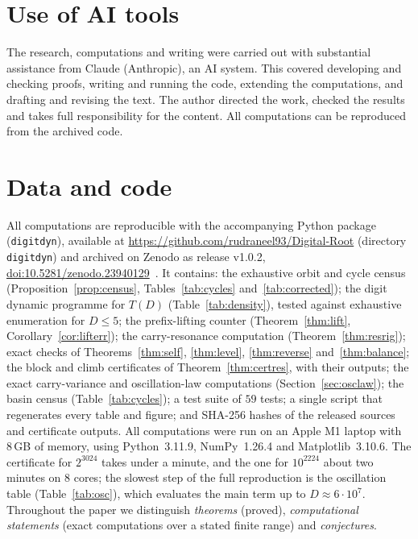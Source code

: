 \documentclass[11pt]{article}
\theoremstyle{definition}
\theoremstyle{remark}
\begin{document}
\section*{Use of AI tools}
The research, computations and writing were carried out with substantial
assistance from Claude (Anthropic), an AI system. This covered developing and
checking proofs, writing and running the code, extending the computations, and
drafting and revising the text. The author directed the work, checked the
results and takes full responsibility for the content. All computations can be
reproduced from the archived code.

\section*{Data and code}
All computations are reproducible with the accompanying Python package
(\texttt{digitdyn}), available at
\url{https://github.com/rudraneel93/Digital-Root} (directory
\texttt{digitdyn}) and archived on Zenodo as release v1.0.2,
\href{https://doi.org/10.5281/zenodo.23940129}{doi:10.5281/zenodo.23940129}~\cite{digitdynZenodo}. It
contains: the exhaustive orbit and cycle census
(Proposition~\ref{prop:census}, Tables~\ref{tab:cycles}
and~\ref{tab:corrected}); the digit dynamic programme for $T(D)$
(Table~\ref{tab:density}), tested against exhaustive enumeration for
$D\le5$; the prefix-lifting counter (Theorem~\ref{thm:lift},
Corollary~\ref{cor:lifterr}); the carry-resonance computation
(Theorem~\ref{thm:resrig}); exact checks of
Theorems~\ref{thm:self}, \ref{thm:level}, \ref{thm:reverse}
and~\ref{thm:balance}; the block and climb certificates of
Theorem~\ref{thm:certres}, with their outputs; the exact carry-variance and
oscillation-law computations (Section~\ref{sec:osclaw}); the basin census
(Table~\ref{tab:cycles}); a test suite of $59$ tests; a single script that
regenerates every table and figure; and SHA-256 hashes of the released
sources and certificate outputs. All computations were run on an Apple M1
laptop with 8\,GB of memory, using Python~3.11.9, NumPy~1.26.4 and
Matplotlib~3.10.6. The certificate for $2^{3024}$ takes under a minute, and the one for
$10^{2224}$ about two minutes on $8$ cores; the slowest step of the full reproduction is the
oscillation table (Table~\ref{tab:osc}), which evaluates the main term up to
$D\approx6\cdot10^7$. Throughout the paper we distinguish \emph{theorems}
(proved), \emph{computational statements} (exact computations over a stated
finite range) and \emph{conjectures}.
\end{document}
